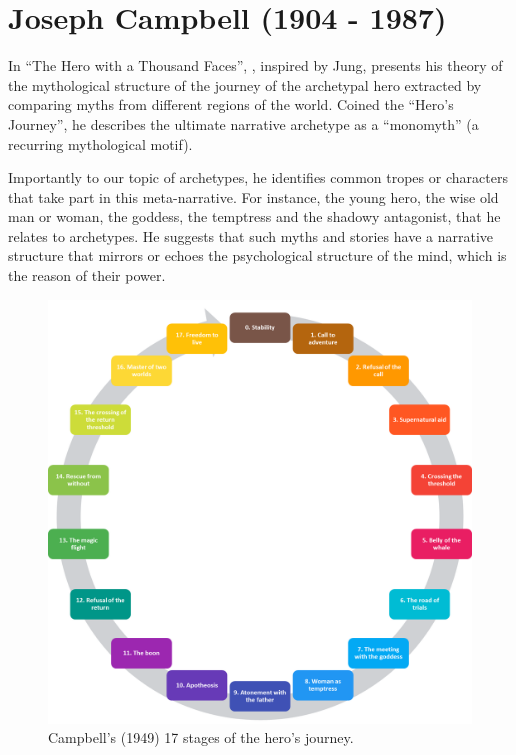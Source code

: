 \documentclass[
]{book}
\begin{document}
\hypertarget{joseph-campbell-1904---1987}{%
\section{Joseph Campbell (1904 - 1987)}\label{joseph-campbell-1904---1987}}

In ``The Hero with a Thousand Faces'', \citet{campbell1949hero}, inspired by Jung, presents his theory of the mythological structure of the journey of the archetypal hero extracted by comparing myths from different regions of the world. Coined the ``Hero's Journey'', he describes the ultimate narrative archetype as a ``monomyth'' (a recurring mythological motif).

Importantly to our topic of archetypes, he identifies common tropes or characters that take part in this meta-narrative. For instance, the young hero, the wise old man or woman, the goddess, the temptress and the shadowy antagonist, that he relates to archetypes. He suggests that such myths and stories have a narrative structure that mirrors or echoes the psychological structure of the mind, which is the reason of their power.

\begin{figure}

{\centering \includegraphics[width=\textwidth]{img/monomyth} 

}

\caption{Campbell's (1949) 17 stages of the hero's journey.}\label{fig:unnamed-chunk-10}
\end{figure}
\end{document}
